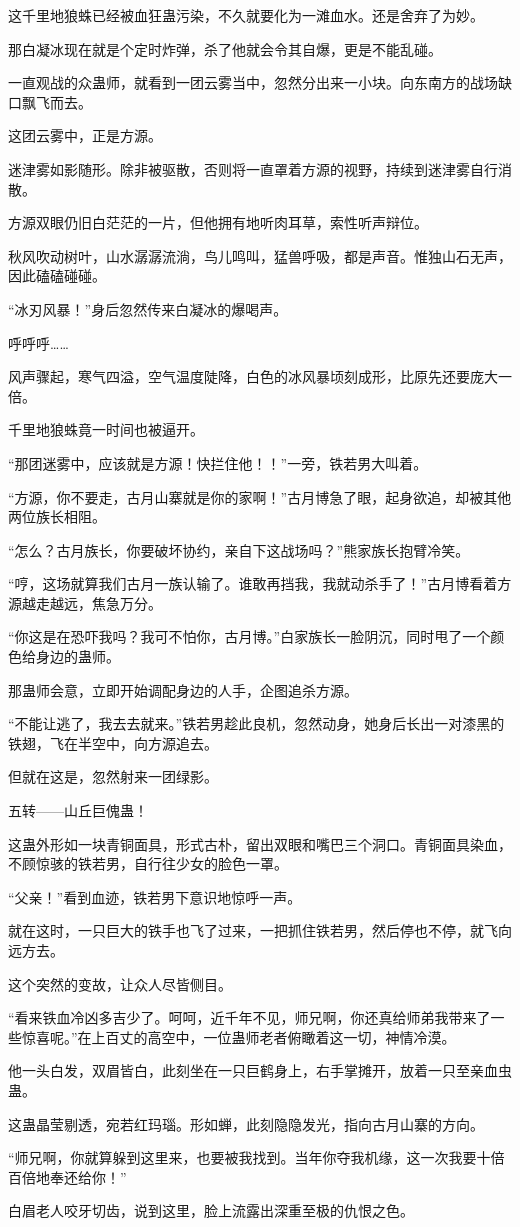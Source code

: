 \begin{this_body}
这千里地狼蛛已经被血狂蛊污染，不久就要化为一滩血水。还是舍弃了为妙。

那白凝冰现在就是个定时炸弹，杀了他就会令其自爆，更是不能乱碰。

一直观战的众蛊师，就看到一团云雾当中，忽然分出来一小块。向东南方的战场缺口飘飞而去。

这团云雾中，正是方源。

迷津雾如影随形。除非被驱散，否则将一直罩着方源的视野，持续到迷津雾自行消散。

方源双眼仍旧白茫茫的一片，但他拥有地听肉耳草，索性听声辩位。

秋风吹动树叶，山水潺潺流淌，鸟儿鸣叫，猛兽呼吸，都是声音。惟独山石无声，因此磕磕碰碰。

“冰刃风暴！”身后忽然传来白凝冰的爆喝声。

呼呼呼……

风声骤起，寒气四溢，空气温度陡降，白色的冰风暴顷刻成形，比原先还要庞大一倍。

千里地狼蛛竟一时间也被逼开。

“那团迷雾中，应该就是方源！快拦住他！！”一旁，铁若男大叫着。

“方源，你不要走，古月山寨就是你的家啊！”古月博急了眼，起身欲追，却被其他两位族长相阻。

“怎么？古月族长，你要破坏协约，亲自下这战场吗？”熊家族长抱臂冷笑。

“哼，这场就算我们古月一族认输了。谁敢再挡我，我就动杀手了！”古月博看着方源越走越远，焦急万分。

“你这是在恐吓我吗？我可不怕你，古月博。”白家族长一脸阴沉，同时甩了一个颜色给身边的蛊师。

那蛊师会意，立即开始调配身边的人手，企图追杀方源。

“不能让逃了，我去去就来。”铁若男趁此良机，忽然动身，她身后长出一对漆黑的铁翅，飞在半空中，向方源追去。

但就在这是，忽然射来一团绿影。

五转——山丘巨傀蛊！

这蛊外形如一块青铜面具，形式古朴，留出双眼和嘴巴三个洞口。青铜面具染血，不顾惊骇的铁若男，自行往少女的脸色一罩。

“父亲！”看到血迹，铁若男下意识地惊呼一声。

就在这时，一只巨大的铁手也飞了过来，一把抓住铁若男，然后停也不停，就飞向远方去。

这个突然的变故，让众人尽皆侧目。

“看来铁血冷凶多吉少了。呵呵，近千年不见，师兄啊，你还真给师弟我带来了一些惊喜呢。”在上百丈的高空中，一位蛊师老者俯瞰着这一切，神情冷漠。

他一头白发，双眉皆白，此刻坐在一只巨鹤身上，右手掌摊开，放着一只至亲血虫蛊。

这蛊晶莹剔透，宛若红玛瑙。形如蝉，此刻隐隐发光，指向古月山寨的方向。

“师兄啊，你就算躲到这里来，也要被我找到。当年你夺我机缘，这一次我要十倍百倍地奉还给你！”

白眉老人咬牙切齿，说到这里，脸上流露出深重至极的仇恨之色。

\end{this_body}

